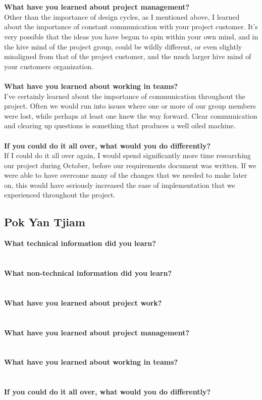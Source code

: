 \documentclass[12pt]{article}
\begin{document}
\\\\
\textbf{What have you learned about project management?}\\
Other than the importance of design cycles, as I mentioned above, I learned about the importance of constant communication with your project customer. It's very possible that the ideas you have begun to spin within your own mind, and in the hive mind of the project group, could be wildly different, or even slightly misaligned from that of the project customer, and the much larger hive mind of your customers organization.
\\\\
\textbf{What have you learned about working in teams?}\\
I've certainly learned about the importance of communication throughout the project. Often we would run into issues where one or more of our group members were lost, while perhaps at least one knew the way forward. Clear communication and clearing up questions is something that produces a well oiled machine.
\\\\
\textbf{If you could do it all over, what would you do differently?}\\
If I could do it all over again, I would spend significantly more time researching our project during October, before our requirements document was written. If we were able to have overcome many of the changes that we needed to make later on, this would have seriously increased the ease of implementation that we experienced throughout the project.
\\

\subsection{Pok Yan Tjiam}
\textbf{What technical information did you learn?}\\
\\\\
\textbf{What non-technical information did you learn?}\\
\\\\
\textbf{What have you learned about project work?}\\
\\\\
\textbf{What have you learned about project management?}\\
\\\\
\textbf{What have you learned about working in teams?}\\
\\\\
\textbf{If you could do it all over, what would you do differently?}\\
\\
\end{document}
